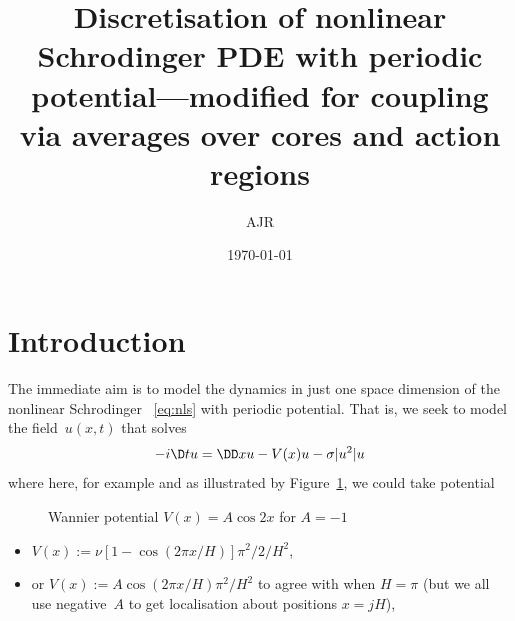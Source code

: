 \documentclass[12pt,a5paper]{article}
\title{Discretisation of nonlinear Schrodinger PDE with periodic potential---modified for coupling via averages over cores and action regions}
\author{AJR}
\date{\today}
\newcommand{\ajr}[1]{%
  \pdfcomment[author=AJR,color={1 1 0},subject={#1}]{#1}}
\begin{document}
\maketitle

\tableofcontents

\section{Introduction}

The immediate aim is to model the dynamics in just one space dimension of the nonlinear Schrodinger \pde~\eqref{eq:nls} with periodic potential.
That is, we seek to model the field~\(u(x,t)\) that solves 
\begin{equation}
-i\D tu=\DD xu-V(x)u-\sigma |u^2|u
\label{eq:nls}
\end{equation}
where here, for example and as illustrated by Figure~\ref{fig:twopotl}, we could take potential 
\begin{figure}
\centering
{}
\caption{Wannier potential \(V(x)=A\cos2x\) for \(A=-1\)}
\label{fig:twopotl}
\end{figure}%
\begin{itemize}
\item \(V(x):=\nu[1-\cos(2\pi x/H)]\pi^2/2/H^2\), 
\item or
\(V(x):=A\cos(2\pi x/H)\pi^2/H^2\) to agree with \cite{Alfimov2002} when \(H=\pi\) (but we all use negative~\(A\) to get localisation about positions \(x=jH\)), 
\end{itemize}
\end{document}
